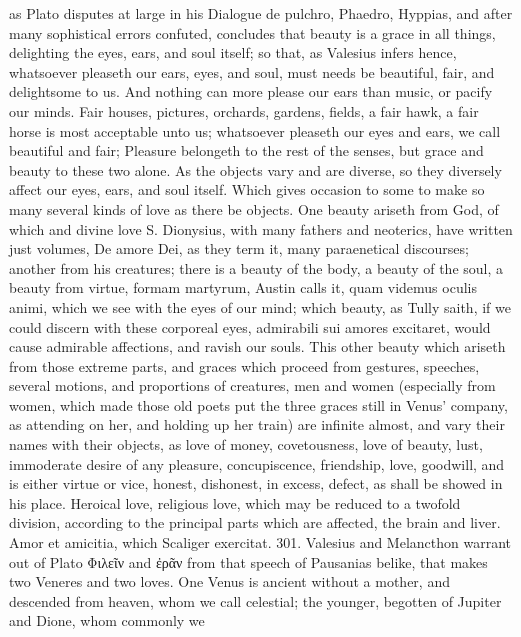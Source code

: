 {as Plato disputes at large in his Dialogue de pulchro, Phaedro,
Hyppias, and after many sophistical errors confuted, concludes that
beauty is a grace in all things, delighting the eyes, ears, and soul
itself; so that, as Valesius infers hence, whatsoever pleaseth our
ears, eyes, and soul, must needs be beautiful, fair, and delightsome to
us. And nothing can more please our ears than music, or pacify
our minds. Fair houses, pictures, orchards, gardens, fields, a fair
hawk, a fair horse is most acceptable unto us; whatsoever pleaseth our
eyes and ears, we call beautiful and fair; Pleasure belongeth to
the rest of the senses, but grace and beauty to these two alone. As the
objects vary and are diverse, so they diversely affect our eyes, ears,
and soul itself. Which gives occasion to some to make so many several
kinds of love as there be objects. One beauty ariseth from God, of
which and divine love S. Dionysius, with many fathers and
neoterics, have written just volumes, De amore Dei, as they term it,
many paraenetical discourses; another from his creatures; there is a
beauty of the body, a beauty of the soul, a beauty from virtue, formam
martyrum, Austin calls it, quam videmus oculis animi, which we see with
the eyes of our mind; which beauty, as Tully saith, if we could discern
with these corporeal eyes, admirabili sui amores excitaret, would cause
admirable affections, and ravish our souls. This other beauty which
ariseth from those extreme parts, and graces which proceed from
gestures, speeches, several motions, and proportions of creatures, men
and women (especially from women, which made those old poets put the
three graces still in Venus' company, as attending on her, and holding
up her train) are infinite almost, and vary their names with their
objects, as love of money, covetousness, love of beauty, lust,
immoderate desire of any pleasure, concupiscence, friendship, love,
goodwill, \etc{} and is either virtue or vice, honest, dishonest, in
excess, defect, as shall be showed in his place. Heroical love,
religious love, \etc{} which may be reduced to a twofold division,
according to the principal parts which are affected, the brain and
liver. Amor et amicitia, which Scaliger exercitat. 301. Valesius and
Melancthon warrant out of Plato Φιλεῖν and ἐρᾶν from that speech of
Pausanias belike, that makes two Veneres and two loves. One Venus
is ancient without a mother, and descended from heaven, whom we call
celestial; the younger, begotten of Jupiter and Dione, whom commonly we
}
